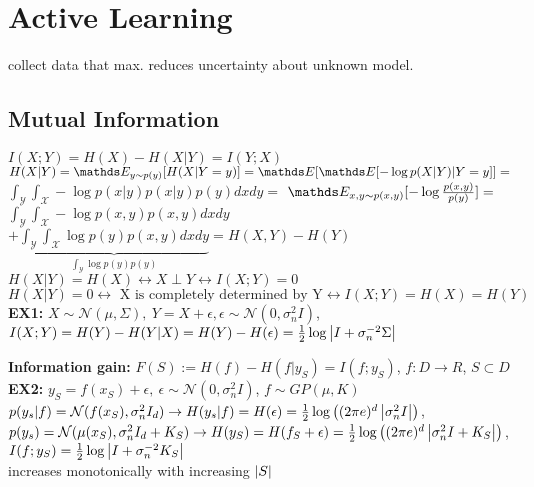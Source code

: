 \section{Active Learning}
collect data that max. reduces uncertainty about unknown model.

\subsection{Mutual Information}
$I(X;Y)=H(X)-H(X|Y)=I(Y;X)$\\
$H(X|Y) = \E[y \sim p(y)]{H(X|Y=y)} = \E{\E{-\log p(X|Y)|Y=y}} =$
$\int_{\mathcal{Y}}\int_{\mathcal{X}} -\log p(x|y) p(x|y) p(y) dx dy=$
$\E[x,y \sim p(x,y)]{-\log \frac{p(x,y)}{p(y)}} =$
$\int_{\mathcal{Y}}\int_{\mathcal{X}} - \log p(x,y) p(x,y) dx dy$
$+ \underbrace{\int_{\mathcal{Y}}\int_{\mathcal{X}} \log p(y) p(x,y) dx dy}_{\int_{\mathcal{Y}} \log p(y) p(y)}
= H(X,Y) - H(Y)$
$ H(X|Y) = H(X) \leftrightarrow X \perp Y \leftrightarrow I(X;Y) = 0$\\
$H(X|Y)=0 \leftrightarrow \text{ X is completely determined by Y} \leftrightarrow  I(X;Y) = H(X) = H(Y)$\\
\textbf{EX1:} $X \sim \mathcal{N}(\mu, \Sigma),\ Y=X+\epsilon,
\epsilon \sim \mathcal{N}(0, \sigma_{n}^{2}I)$,
$I(X;Y)=H(Y)-H(Y|X) = H(Y)-H(\epsilon) = \frac{1}{2} \log \left\lvert I+ \sigma_{n}^{-2}\Sigma\right\rvert$

\textbf{Information gain:}
$F(S) := H(f)-H(f|y_{S}) = I(f;y_{S})$, $f: D \rightarrow R$, $S \subset D$\\
\textbf{\color{orange} EX2:}\color{black} $y_{S} = f(x_{S}) + \epsilon,\ \epsilon \sim \mathcal{N}(0, \sigma_{n}^{2}I)$, $f \sim GP(\mu, K)$
$p(y_{s}|f) = \mathcal{N}(f(x_{S}), \sigma_{n}^{2} I_{d})
\rightarrow H(y_{s}|f) = H(\epsilon)= \frac{1}{2}\log \left((2\pi e)^{d} \left\lvert\sigma_{n}^{2}I\right\rvert\right)$,
$p(y_{s}) = \mathcal{N}(\mu(x_{S}), \sigma_{n}^{2} I_{d} + K_{S})
\rightarrow H(y_{S}) = H(f_{S} + \epsilon) =\frac{1}{2}\log \left((2\pi e)^{d} \left\lvert\sigma_{n}^{2}I + K_{S}\right\rvert\right)$,
$I(f;y_{S}) = \frac{1}{2} \log \left\lvert I+ \sigma_{n}^{-2} K_{S}\right\rvert$\\
increases monotonically with increasing $\left\lvert S\right\rvert$

